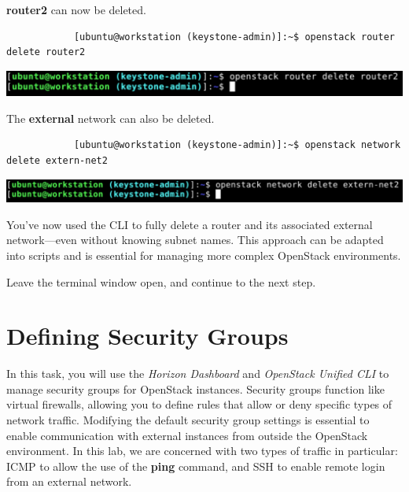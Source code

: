 \documentclass[letterpaper, 12pt]{article}
\begin{document}
\begin{enumerate}
    \begin{labstep}
        \textbf{router2} can now be deleted.
        \begin{lstlisting}
            [ubuntu@workstation (keystone-admin)]:~$ openstack router delete router2
        \end{lstlisting}

        \begin{center}
            \includegraphics[width=\linewidth]{images/part4/step9.png}
        \end{center}
    \end{labstep}

    \begin{labstep}
        The \textbf{external} network can also be deleted.
        \begin{lstlisting}
            [ubuntu@workstation (keystone-admin)]:~$ openstack network delete extern-net2
        \end{lstlisting}

        \begin{center}
            \includegraphics[width=\linewidth]{images/part4/step10.png}
        \end{center}
    \end{labstep}

    \begin{notebox}
        You've now used the CLI to fully delete a router and its associated external network---even without knowing subnet names.
        This approach can be adapted into scripts and is essential for managing more complex OpenStack environments.
    \end{notebox}

    \begin{labstep}
        Leave the terminal window open, and continue to the next step.
    \end{labstep}

\end{enumerate}

\section{Defining Security Groups}\label{sec:defining-security-groups}
In this task, you will use the \textit{Horizon Dashboard} and \textit{OpenStack Unified CLI} to manage security groups for OpenStack instances.
Security groups function like virtual firewalls, allowing you to define rules that allow or deny specific types of network traffic.
Modifying the default security group settings is essential to enable communication with external instances from outside the OpenStack environment.
In this lab, we are concerned with two types of traffic in particular: ICMP to allow the use of the \textbf{ping} command, and SSH to enable remote login from an external network.
\end{document}
